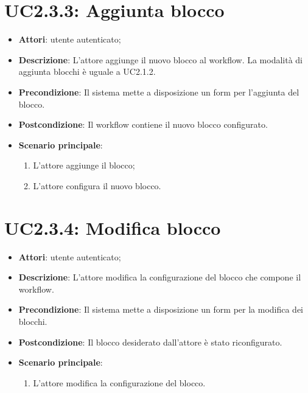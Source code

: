 \section{UC2.3.3: Aggiunta blocco}
\label{UC2.3.3}
\begin{itemize}
	\item \textbf{Attori}: utente autenticato;
	\item \textbf{Descrizione}: L'attore aggiunge il nuovo blocco al workflow. La modalità di aggiunta blocchi è uguale a UC2.1.2.
	\item \textbf{Precondizione}: Il sistema mette a disposizione un form per l'aggiunta del blocco.
	\item \textbf{Postcondizione}: Il workflow contiene il nuovo blocco configurato.
	\item \textbf{Scenario principale}:
	\begin{enumerate} \item L'attore aggiunge il blocco;  \item  L'attore configura il nuovo blocco.\end{enumerate}
\end{itemize}

\section{UC2.3.4: Modifica blocco}
\label{UC2.3.4}
\begin{itemize}
	\item \textbf{Attori}: utente autenticato;
	\item \textbf{Descrizione}: L'attore modifica la configurazione del blocco che compone il workflow.
	\item \textbf{Precondizione}: Il sistema mette a disposizione un form per la modifica dei blocchi.
	\item \textbf{Postcondizione}: Il blocco desiderato dall'attore è stato riconfigurato.
	\item \textbf{Scenario principale}:
	\begin{enumerate} \item L'attore modifica la configurazione del blocco.\end{enumerate}
\end{itemize}

